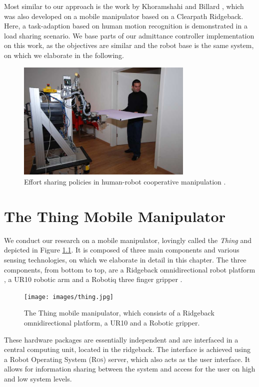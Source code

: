 Most similar to our approach is the work by Khoramshahi and Billard \citep{khoramshahi2018dynamical}, which was also developed on a mobile manipulator based on a Clearpath Ridgeback. Here, a task-adaption based on human motion recognition is demonstrated in a load sharing scenario. We base parts of our admittance controller implementation on this work, as the objectives are similar and the robot base is the same system, on which we elaborate in the following.

\begin{figure}[h]
   \centering
   \includegraphics[width=0.75\textwidth]{images/lawitzky2010.png}
   \caption{Effort sharing policies in human-robot cooperative manipulation  \citep{lawitzky2010load}.}
   \label{pics:lawitzky2010}
\end{figure}

\chapter{The Thing Mobile Manipulator}
We conduct our research on a mobile manipulator, lovingly called the \emph{Thing} and depicted in Figure \ref{pics:thing}. It is composed of three main components and various sensing technologies, on which we elaborate in detail in this chapter. The three components, from bottom to top, are a Ridgeback omnidirectional robot platform \citep{ridgeback}, a UR10 robotic arm \citep{ur10} and a Robotiq three finger gripper \citep{robotiqGripper}.

\begin{figure}[h]
   \centering
   \texttt{[image: images/thing.jpg]}
   \caption{The Thing mobile manipulator, which consists of a Ridgeback omnidirectional platform, a UR10 and a Robotic gripper.}
   \label{pics:thing}
\end{figure}

These hardware packages are essentially independent and are interfaced in a central computing unit, located in the ridgeback. The interface is achieved using a Robot Operating System (\textsc{Ros}) server, which also acts as the user interface. It allows for information sharing between the system and access for the user on high and low system levels.

